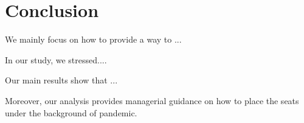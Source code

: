 \section{Conclusion}

We mainly focus on how to provide a way to ...

In our study, we stressed....

Our main results show that ...

Moreover, our analysis provides managerial guidance on how to place the seats under the background of pandemic.
